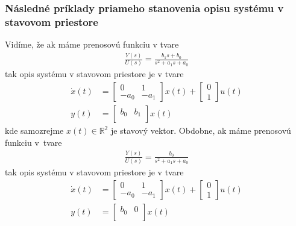 \documentclass[a4paper, 10pt, ]{article}
\begin{document}
\subsubsection{Následné príklady priameho stanovenia opisu systému v stavovom priestore}

Vidíme, že ak máme prenosovú funkciu v tvare
\begin{align} \label{tfVseob02}
	\frac{Y(s)}{U(s)} = \frac{b_1 s + b_0}{ s^2 + a_1 s + a_0}
\end{align}
tak opis systému v stavovom priestore je v tvare
\begin{subequations}
\begin{align}
    \dot x(t)
    &=
    \begin{bmatrix}
    	0 & 1 \\
    	- a_0 & - a_1
  	\end{bmatrix}
    x(t)
    +
    \begin{bmatrix}
    	  0 \\
          1
 	\end{bmatrix}
    u(t)
    \\
    y(t)
    &=
    \begin{bmatrix}
        b_0 & b_1 \\
    \end{bmatrix}
    x(t)
\end{align}
\end{subequations}
kde samozrejme $x(t) \in \mathbb R^2$ je stavový vektor. 
Obdobne, ak máme prenosovú funkciu v~tvare
\begin{align} 
	\frac{Y(s)}{U(s)} = \frac{b_0}{ s^2 + a_1 s + a_0}
\end{align}
tak opis systému v stavovom priestore je v tvare
\begin{subequations}
\begin{align}
    \dot x(t)
    &=
    \begin{bmatrix}
    	0 & 1 \\
    	- a_0 & - a_1
  	\end{bmatrix}
    x(t)
    +
    \begin{bmatrix}
    	  0 \\
          1
 	\end{bmatrix}
    u(t)
    \\
    y(t)
    &=
    \begin{bmatrix}
        b_0 & 0 \\
    \end{bmatrix}
    x(t)
\end{align}
\end{subequations}
\end{document}

